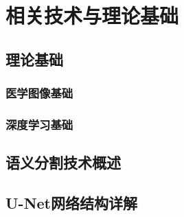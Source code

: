 \section{相关技术与理论基础}

\subsection{理论基础}

\subsubsection{医学图像基础}

\subsubsection{深度学习基础}

\subsection{语义分割技术概述}


\subsection{U-Net网络结构详解}
